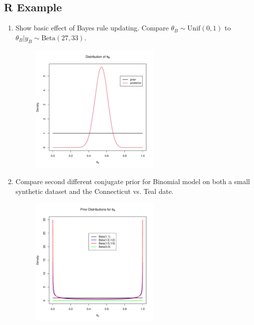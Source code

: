 \subsection{R Example}
\begin{enumerate}
    \item Show basic effect of Bayes rule updating. Compare $\theta_B \sim \text{Unif}(0, 1)$ to $\theta_B | y_B \sim \text{Beta}(27, 33)$.
    \begin{figure}[H]
    	\centering
    	\includegraphics[width=0.6\textwidth]{R/fig/fig1.pdf}
    \end{figure}
    \item Compare second different conjugate prior for Binomial model on both a small synthetic dataset and the Connecticut vs. Teal date.
    \begin{figure}[H]
    	\centering
    	\includegraphics[width=0.6\textwidth]{R/fig/fig2.pdf}
    \end{figure}
    \begin{figure}[H]
    	\centering

\end{figure}
\end{enumerate}
